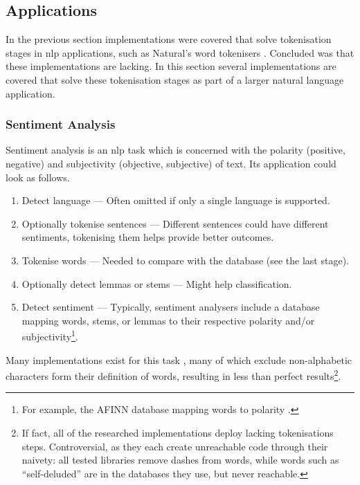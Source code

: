 \subsection{Applications}\label{applications}

In the previous section implementations were covered that solve
tokenisation stages in \gls{nlp} applications, such as Natural's word
tokenisers \autocite{NaturalNode/natural-source-code}. Concluded was
that these implementations are lacking. In this section several
implementations are covered that solve these tokenisation stages as part
of a larger natural language application.

\subsubsection{Sentiment Analysis}\label{sentiment-analysis}

Sentiment analysis is an \gls{nlp} task which is concerned with the
polarity (positive, negative) and subjectivity (objective, subjective)
of text. Its application could look as follows.

\begin{enumerate}
\def\labelenumi{\arabic{enumi}.}
\itemsep1pt\parskip0pt
\item
  Detect language --- Often omitted if only a single language is
  supported.
\item
  Optionally tokenise sentences --- Different sentences could have
  different sentiments, tokenising them helps provide better outcomes.
\item
  Tokenise words --- Needed to compare with the database (see the last
  stage).
\item
  Optionally detect lemmas or stems --- Might help classification.
\item
  Detect sentiment --- Typically, sentiment analysers include a database
  mapping words, stems, or lemmas to their respective polarity and/or
  subjectivity\footnote{For example, the AFINN database mapping words to
    polarity \autocite{nielsen-finn-arup-afinn}.}.
\end{enumerate}

Many implementations exist for this task \autocites[e.g.,][]{thinkroth/sentimental-source-code}{mileszim/sediment-source-code}{thisandagain/sentiment-source-code},
many of which exclude non-alphabetic characters form their definition of
words, resulting in less than perfect results\footnote{If fact, all of
  the researched implementations deploy lacking tokenisations steps.
  Controversial, as they each create unreachable code through their
  naivety: all tested libraries remove dashes from words, while words
  such as ``self-deluded'' are in the databases they use, but never
  reachable.}.

